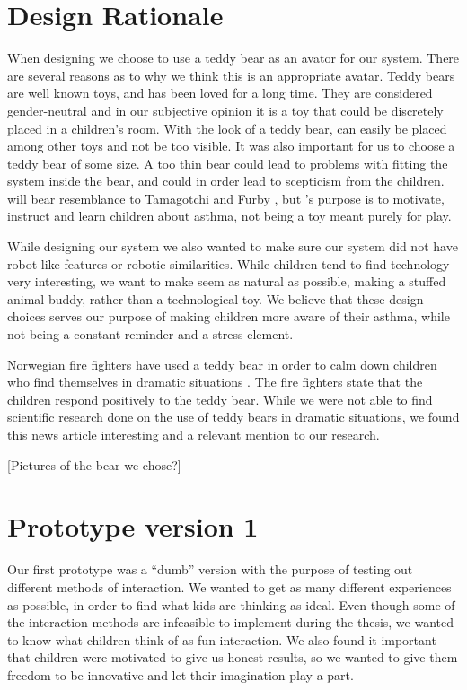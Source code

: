 

\section{Design Rationale}
When designing \buddy{} we choose to use a teddy bear as an avator for our system. There are several reasons as to why we think this is an appropriate avatar. Teddy bears are well known toys, and has been loved for a long time. They are considered gender-neutral \cite{stagnitti1997determining} \cite{cherney2006gender} and in our subjective opinion it is a toy that could be discretely placed in a children's room. With the look of a teddy bear, \buddy{} can easily be placed among other toys and not be too visible. It was also important for us to choose a teddy bear of some size. A too thin bear could lead to problems with fitting the system inside the bear, and could in order lead to scepticism from the children. \buddy{} will bear resemblance to Tamagotchi \cite{tamagotchi} and Furby \cite{furby}, but \buddy{}'s purpose is to motivate, instruct and learn children about asthma, not being a toy meant purely for play. 

While designing our system we also wanted to make sure our system did not have robot-like features or robotic similarities. While children tend to find technology very interesting, we want to make \buddy{} seem as natural as possible, making a stuffed animal buddy, rather than a technological toy. We believe that these design choices serves our purpose of making children more aware of their asthma, while not being a constant reminder and a stress element.

Norwegian fire fighters have used a teddy bear in order to calm down children who find themselves in dramatic situations . The fire fighters state that the children respond positively to the teddy bear. 
While we were not able to find scientific research done on the use of teddy bears in dramatic situations, we found this news article interesting and a relevant mention to our research.

[Pictures of the bear we chose?]

 
\section{Prototype version 1}
Our first prototype was a ``dumb'' version with the purpose of testing out different methods of interaction. We wanted to get as many different experiences as possible, in order to find what kids are thinking as ideal. Even though some of the interaction methods are infeasible to implement during the thesis, we wanted to know what children think of as fun interaction. We also found it important that children were motivated to give us honest results, so we wanted to give them freedom to be innovative and let their imagination play a part.  

